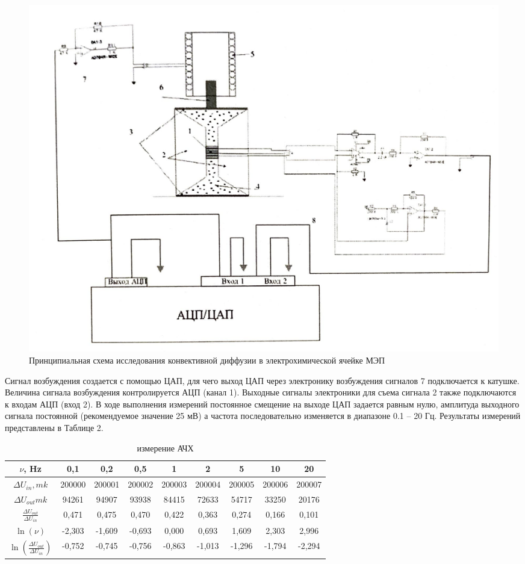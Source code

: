 \documentclass[a4paper,12pt]{article}
\begin{document}
\begin{figure}[h!]
	\begin{center}
		\includegraphics[scale=0.8]{fig6}
		\caption{Принципиальная схема исследования конвективной диффузии в электрохимической ячейке МЭП}
	\end{center}
\end{figure}

Сигнал возбуждения создается с помощью ЦАП, для чего выход ЦАП через электронику возбуждения сигналов 7 подключается к катушке. Величина сигнала возбуждения контролируется АЦП (канал 1). Выходные сигналы электроники для съема сигнала 2 также подключаются к входам АЦП (вход 2). В ходе выполнения измерений постоянное смещение на выходе ЦАП задается равным нулю, амплитуда выходного сигнала постоянной (рекомендуемое значение 25 мВ) а частота последовательно изменяется в диапазоне 0.1 -- 20 Гц. Результаты измерений представлены в Таблице 2.

\newpage

\begin{table}[h!]
\begin{center}
\caption{измерение АЧХ}
\begin{tabular}{|c|c|c|c|c|c|c|c|c|}
\hline
$\nu$, Hz        & 0,1    & 0,2    & 0,5    & 1      & 2      & 5      & 10     & 20     \\ \hline
$\Delta U_{in}, mk$     & 200000 & 200001 & 200002 & 200003 & 200004 & 200005 & 200006 & 200007 \\ \hline
$\Delta U_{out} mk$  & 94261  & 94907  & 93938  & 84415  & 72633  & 54717  & 33250  & 20176  \\ \hline
$\frac{\Delta U_{out}}{\Delta U_{in}}$ & 0,471  & 0,475  & 0,470  & 0,422  & 0,363  & 0,274  & 0,166  & 0,101  \\ \hline
$\ln(\nu)$      & -2,303 & -1,609 & -0,693 & 0,000  & 0,693  & 1,609  & 2,303  & 2,996  \\ \hline
$\ln(\frac{\Delta U_{out}}{\Delta U_{in}})$  & -0,752 & -0,745 & -0,756 & -0,863 & -1,013 & -1,296 & -1,794 & -2,294 \\ \hline
\end{tabular}
\end{center}
\end{table}
\end{document}
